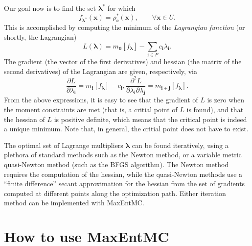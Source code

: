 \documentclass[12pt]{amsart}
\numberwithin{equation}{section}
\newcommand\BS{\boldsymbol}
\newcommand\parderiv[2]{\frac{\partial #1}{\partial #2}}
\begin{document}
Our goal now is to find the set $\BS\lambda^*$ for which
%
\begin{equation}
f_{\BS\lambda^*}(\BS x)=\rho_{\BS c}^*(\BS x), \qquad\forall\BS x\in
U.
\end{equation}
%
This is accomplished by computing the minimum of the {\em Lagrangian
  function} (or shortly, the Lagrangian)
%
\begin{equation}
\label{eq:lagrangian}
L(\BS\lambda)=m_{\BS 0}[f_{\BS\lambda}]-\sum_{\BS i\in
  P}c_{\BS i}\lambda_{\BS i}.
\end{equation}
%
The gradient (the vector of the first derivatives) and hessian (the
matrix of the second derivatives) of the Lagrangian are given,
respectively, via
%
\begin{subequations}
\begin{equation}
\parderiv L{\lambda_{\BS i}}=m_{\BS i}[f_{\BS\lambda}]-c_{\BS i},
\end{equation}
\begin{equation}
\parderiv{^2 L}{\lambda_{\BS i}\partial\lambda_{\BS j}}=m_{\BS i+\BS
  j}[f_{\BS\lambda}].
\end{equation}
\end{subequations}
%
From the above expressions, it is easy to see that the gradient of $L$
is zero when the moment constraints are met (that is, a critial point
of $L$ is found), and that the hessian of $L$ is positive definite,
which means that the critical point is indeed a unique minimum. Note
that, in general, the critial point does not have to exist.

The optimal set of Lagrange multipliers $\BS\lambda$ can be found
iteratively, using a plethora of standard methods such as the Newton
method, or a variable metric quasi-Newton method (such as the BFGS
algorithm). The Newton method requires the computation of the hessian,
while the quasi-Newton methods use a ``finite difference'' secant
approximation for the hessian from the set of gradients computed at
different points along the optimization path. Either iteration method
can be implemented with MaxEntMC.

\section{How to use MaxEntMC}
\end{document}
